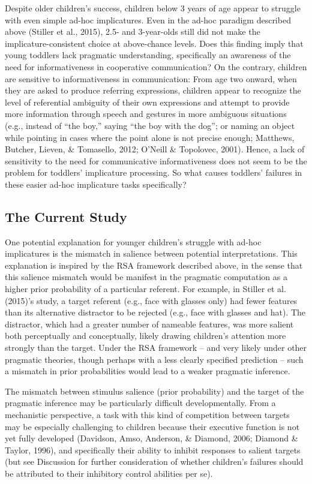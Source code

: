 \documentclass[man]{apa6}
\begin{document}
Despite older children's success, children below 3 years of age appear
to struggle with even simple ad-hoc implicatures. Even in the ad-hoc
paradigm described above (Stiller et al., 2015), 2.5- and 3-year-olds
still did not make the implicature-consistent choice at above-chance
levels. Does this finding imply that young toddlers lack pragmatic
understanding, specifically an awareness of the need for informativeness
in cooperative communication? On the contrary, children are sensitive to
informativeness in communication: From age two onward, when they are
asked to produce referring expressions, children appear to recognize the
level of referential ambiguity of their own expressions and attempt to
provide more information through speech and gestures in more ambiguous
situations (e.g., instead of ``the boy,'' saying ``the boy with the
dog''; or naming an object while pointing in cases where the point alone
is not precise enough; Matthews, Butcher, Lieven, \& Tomasello, 2012;
O'Neill \& Topolovec, 2001). Hence, a lack of sensitivity to the need
for communicative informativeness does not seem to be the problem for
toddlers' implicature processing. So what causes toddlers' failures in
these easier ad-hoc implicature tasks specifically?

\subsection{The Current Study}\label{the-current-study}

One potential explanation for younger children's struggle with ad-hoc
implicatures is the mismatch in salience between potential
interpretations. This explanation is inspired by the RSA framework
described above, in the sense that this salience mismatch would be
manifest in the pragmatic computation as a higher prior probability of a
particular referent. For example, in Stiller et al. (2015)'s study, a
target referent (e.g., face with glasses only) had fewer features than
its alternative distractor to be rejected (e.g., face with glasses and
hat). The distractor, which had a greater number of nameable features,
was more salient both perceptually and conceptually, likely drawing
children's attention more strongly than the target. Under the RSA
framework -- and very likely under other pragmatic theories, though
perhaps with a less clearly specified prediction -- such a mismatch in
prior probabilities would lead to a weaker pragmatic inference.

The mismatch between stimulus salience (prior probability) and the
target of the pragmatic inference may be particularly difficult
developmentally. From a mechanistic perspective, a task with this kind
of competition between targets may be especially challenging to children
because their executive function is not yet fully developed (Davidson,
Amso, Anderson, \& Diamond, 2006; Diamond \& Taylor, 1996), and
specifically their ability to inhibit responses to salient targets (but
see Discussion for further consideration of whether children's failures
should be attributed to their inhibitory control abilities per se).
\end{document}
